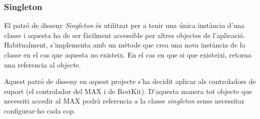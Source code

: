 
\subsubsection{Singleton}

El patró de disseny \textit{Singleton} és utilitzat per a tenir una única instància d'una classe i aquesta ha de ser fàcilment accessible per altres objectes de l'aplicació. Habitualment, s'implementa amb un mètode que crea una nova instància de la classe en el cas que aquesta no existeix. En el cas en que si que existeixi, retorna una referencia al objecte.

Aquest patró de disseny en aquest projecte s'ha decidit aplicar als controladors de suport (el controlador del MAX i de RestKit). D'aquesta manera tot objecte que necessiti accedir al MAX podrà referencia a la classe \textit{singleton} sense necessitar configurar-ho cada cop.